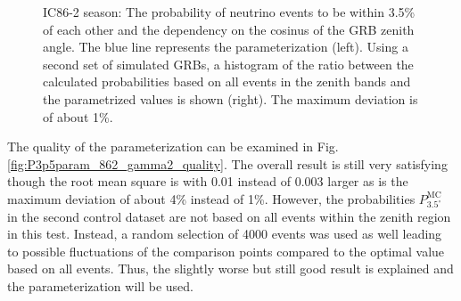 \begin{figure}[h]
\centering
 \captionsetup{width=.9\textwidth}
\caption{IC86-2 season: The probability of neutrino events to be within 3.5\% 
of each other and the dependency on the cosinus of the GRB zenith angle. The 
blue line represents the parameterization (left). Using a second set of 
simulated GRBs, a histogram 
of the ratio between the calculated probabilities based on all events in 
the zenith bands and the parametrized values is shown (right). The maximum 
deviation 
is of about 1\%.}
\end{figure}
The quality of the parameterization can be examined in Fig. 
\ref{fig:P3p5param_862_gamma2_quality}. The overall result is still very 
satisfying though the root mean square is with 0.01 instead of 0.003 larger as 
is the maximum deviation of about 4\% instead of 1\%. However, the 
probabilities $P_{3.5^\circ}^\text{MC}$ in the second control dataset are 
not based on all events within the zenith region in this test. Instead, a 
random selection of 4000 events was used as well leading to possible 
fluctuations of the comparison points compared to the optimal value based on all 
events.
Thus, the slightly worse but still good result is explained and the 
parameterization will be used.


